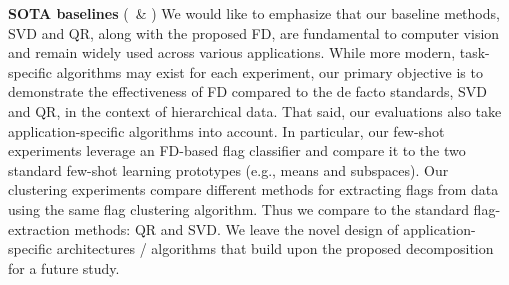 \documentclass[10pt,twocolumn,letterpaper]{article}
\begin{document}
\noindent \textbf{SOTA baselines} (\Rone~\& \Rfour) 
{We would like to emphasize that our baseline methods, SVD and QR, along with the proposed FD, are fundamental to computer vision and remain widely used across various applications. While more modern, task-specific algorithms may exist for each experiment, our primary objective is to demonstrate the effectiveness of FD compared to the de facto standards, SVD and QR, in the context of hierarchical data. That said, our evaluations also take application-specific algorithms into account. In particular, our few-shot experiments leverage an FD-based flag classifier and compare it to the two standard few-shot learning prototypes (e.g., means and subspaces). Our clustering experiments compare different methods for extracting flags from data using the same flag clustering algorithm. Thus we compare to the standard flag-extraction methods: QR and SVD. We leave the novel design of application-specific architectures / algorithms that build upon the proposed decomposition for a future study.} 
\end{document}
